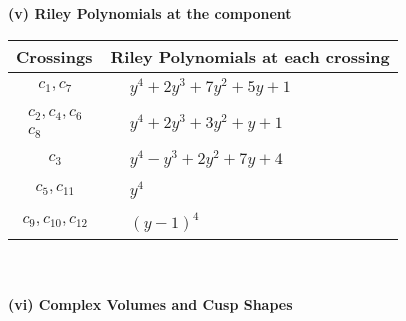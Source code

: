 \documentclass[1p]{elsarticle_modified}
\theoremstyle{definition}
\begin{document}
\newpage\renewcommand{\arraystretch}{1}
\flushleft \textbf{(v) Riley Polynomials at the component}\newline \\
\begin{tabular}{m{50pt}|m{274pt}}
Crossings & \hspace{64pt}Riley Polynomials at each crossing \\
\hline $$\begin{aligned}c_{1},c_{7}\end{aligned}$$&$\begin{aligned}
&y^4+2 y^3+7 y^2+5 y+1
\end{aligned}$\\
\hline $$\begin{aligned}c_{2},c_{4},c_{6}\\c_{8}\end{aligned}$$&$\begin{aligned}
&y^4+2 y^3+3 y^2+y+1
\end{aligned}$\\
\hline $$\begin{aligned}c_{3}\end{aligned}$$&$\begin{aligned}
&y^4- y^3+2 y^2+7 y+4
\end{aligned}$\\
\hline $$\begin{aligned}c_{5},c_{11}\end{aligned}$$&$\begin{aligned}
&y^4
\end{aligned}$\\
\hline $$\begin{aligned}c_{9},c_{10},c_{12}\end{aligned}$$&$\begin{aligned}
&(y-1)^4
\end{aligned}$\\
\hline
\end{tabular}\\~\\
\newpage\flushleft \textbf{(vi) Complex Volumes and Cusp Shapes}
\end{document}
